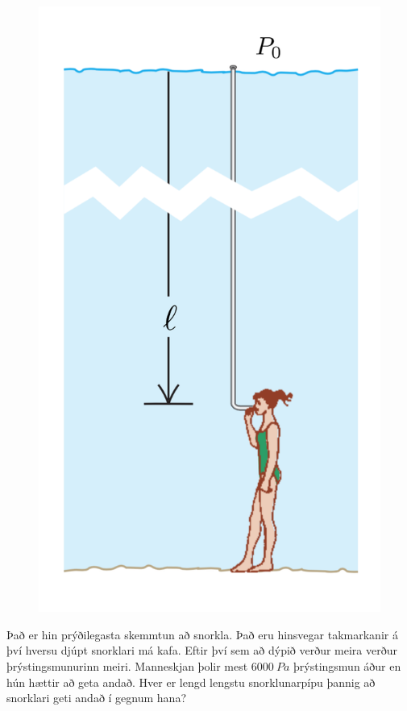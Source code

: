 \ifdefined \wholebook \else\documentclass[oneside]{book}\usepackage{EdlBook}\graphicspath{{figures/}}
\begin{document}
\begin{enumerate}[label = \textbf{Dæmi \thechapter.\arabic*.}]
\begin{minipage}{\linewidth}
\begin{figure}
\vspace{-0.75cm}
\includegraphics[scale = 0.245]{images/kafa2.png}
\end{figure}

\item Það er hin prýðilegasta skemmtun að snorkla. Það eru hinsvegar takmarkanir á því hversu djúpt snorklari má kafa. Eftir því sem að dýpið verður meira verður þrýstingsmunurinn meiri. Manneskjan þolir mest $\SI{6000}{Pa}$ þrýstingsmun áður en hún hættir að geta andað. Hver er lengd lengstu snorklunarpípu þannig að snorklari geti andað í gegnum hana?


\end{minipage}
\end{enumerate}
\end{document}
